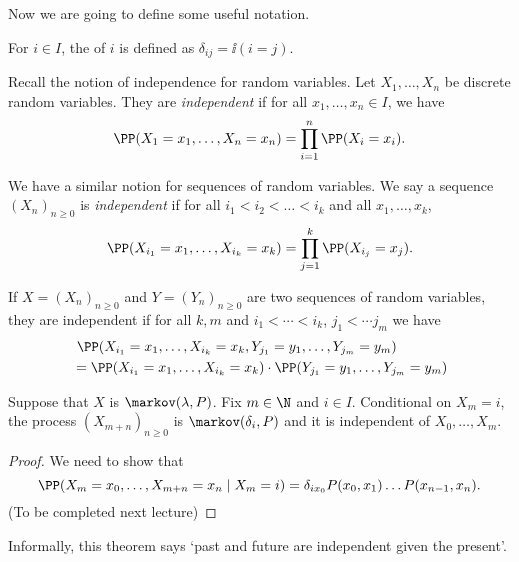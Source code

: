 \documentclass[a4paper]{scrartcl}
\begin{document}
Now we are going to define some useful notation.

\begin{definition}
	For $i \in I$, the  of $i$ is defined as
	$\delta_{ij} = \ii(i = j)$.
\end{definition}

Recall the notion of independence for random variables. Let $X_1, \dots, X_n$ be discrete random variables. They are \emph{independent} if for all $x_1, \dots, x_n \in I$, we have
$$
\PP(X_1= x_1, \dots, X_n = x_n) = \prod_{i = 1}^n \PP(X_i = x_i).
$$

We have a similar notion for sequences of random variables. We say a sequence $(X_n)_{n \geq 0}$ is \emph{independent} if for all $i_1 < i_2 < \dots < i_k$ and all $x_1, \dots, x_k$,
$$
\PP(X_{i_1} = x_1, \dots, X_{i_k} = x_k) = \prod_{j = 1}^k \PP(X_{i_j} = x_j).
$$

If $X = (X_n)_{n \geq 0}$ and $Y = (Y_n)_{n \geq 0}$ are two sequences of random variables, they are independent if for all $k, m$ and $i_1 < \cdots < i_k$, $j_1 < \cdots j_m$ we have
\begin{align*}
	&\ \PP(X_{i_1} = x_1, \dots, X_{i_k} = x_k, Y_{j_1} = y_1, \dots, Y_{j_m} = y_m) \\
	&= \PP(X_{i_1} = x_1, \dots, X_{i_k} = x_k) \cdot \PP(Y_{j_1} = y_1, \dots, Y_{j_m} = y_m) 
\end{align*}

\begin{theorem}
	Suppose that $X$ is $\markov(\lambda, P)$. Fix $m \in \N$ and $i \in I$. Conditional on $X_m = i$, the process $(X_{m + n})_{n \geq 0}$ is $\markov(\delta_i, P)$ and it is independent of $X_0, \dots, X_m$.
\end{theorem}

\begin{proof}
	We need to show that
	$$
	\PP(X_{m} = x_0, \dots, X_{m + n} = x_n \mid X_m = i) = \delta_{i x_0}P(x_0, x_1) \dots P(x_{n - 1}, x_n).
	$$
	(To be completed next lecture)
\end{proof}

\begin{remark}
	Informally, this theorem says `past and future are independent given the present'.
\end{remark}
\end{document}
